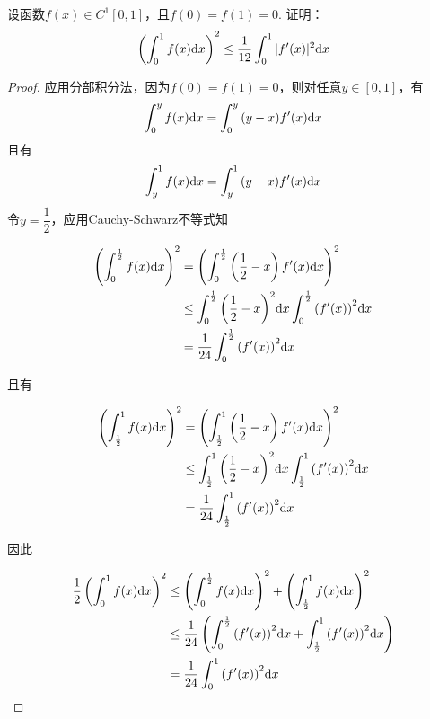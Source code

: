 \begin{proposition}
    
    设函数$f(x) \in C^1[0,1]$，且$f(0) = f(1) = 0$. 证明：
    $$\left( \int_{0}^{1}{f(x)}\mathrm{d} x \right)^2 \leq \dfrac{1}{12} \int_{0}^{1}{|f'(x)|^2}\mathrm{d} x$$

\end{proposition}

\begin{proof}

    应用分部积分法，因为$f(0) = f(1) = 0$，则对任意$y \in [0,1]$，有
    $$\int_{0}^{y}{f(x)}\mathrm{d} x = \int_{0}^{y}{(y - x)f'(x)}\mathrm{d} x$$
    且有
    $$\int_{y}^{1}{f(x)}\mathrm{d} x = \int_{y}^{1}{(y - x)f'(x)}\mathrm{d} x$$
    令$y = \dfrac{1}{2}$，应用\textup{Cauchy-Schwarz}不等式知
    
    \begin{align*}
        \left( \int_{0}^{\frac{1}{2}}{f(x)}\mathrm{d} x \right)^2 & = \left( \int_{0}^{\frac{1}{2}}{\left( \dfrac{1}{2} - x \right)f'(x)}\mathrm{d} x \right)^2 \\
        & \leq \int_{0}^{\frac{1}{2}}{\left( \dfrac{1}{2} - x \right)^2}\mathrm{d} x \int_{0}^{\frac{1}{2}}{\left( f'(x) \right)^2}\mathrm{d} x \\
        & = \dfrac{1}{24} \int_{0}^{\frac{1}{2}}{\left( f'(x) \right)^2}\mathrm{d} x
    \end{align*}

    且有

    \begin{align*}
        \left( \int_{\frac{1}{2}}^{1}{f(x)}\mathrm{d} x \right)^2 & = \left( \int_{\frac{1}{2}}^{1}{\left( \dfrac{1}{2} - x \right)f'(x)}\mathrm{d} x \right)^2 \\
        & \leq \int_{\frac{1}{2}}^{1}{\left( \dfrac{1}{2} - x \right)^2}\mathrm{d} x \int_{\frac{1}{2}}^{1}{\left( f'(x) \right)^2}\mathrm{d} x \\
        & = \dfrac{1}{24} \int_{\frac{1}{2}}^{1}{\left( f'(x) \right)^2}\mathrm{d} x
    \end{align*}

    因此

    \begin{align*}
        \dfrac{1}{2} \left( \int_{0}^{1}{f(x)}\mathrm{d} x\right)^2 & \leq \left( \int_{0}^{\frac{1}{2}}{f(x)}\mathrm{d} x\right)^2 + \left( \int_{\frac{1}{2}}^{1}{f(x)}\mathrm{d} x\right)^2 \\
        & \leq \dfrac{1}{24} \left( \int_{0}^{\frac{1}{2}}{\left( f'(x) \right)^2}\mathrm{d} x + \int_{\frac{1}{2}}^{1}{\left( f'(x) \right)^2}\mathrm{d} x \right) \\
        & = \dfrac{1}{24} \int_{0}^{1}{\left( f'(x) \right)^2}\mathrm{d} x
    \end{align*}

\end{proof}
